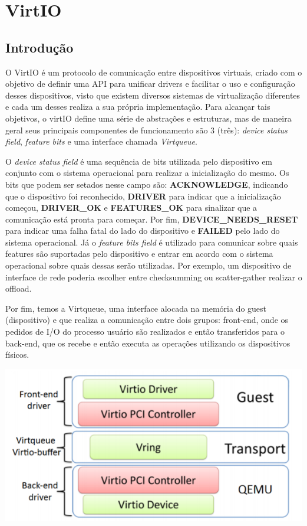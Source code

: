 \graphicspath{ {./assets/} }

\section*{VirtIO}

\subsection{Introdução}

O VirtIO é um protocolo de comunicação entre dispositivos virtuais, criado com o objetivo de definir uma API para unificar drivers e facilitar o uso e configuração desses dispositivos, 
visto que existem diversos sistemas de virtualização diferentes e cada um desses realiza a sua própria implementação.
Para alcançar tais objetivos, o virtIO define uma série de abstrações e estruturas, mas de maneira geral seus principais componentes de funcionamento são 3 (três): 
\emph{device status field}, \emph{feature bits} e uma interface chamada \emph{Virtqueue}.


O \emph{device status field} é uma sequência de bits utilizada pelo dispositivo em conjunto com o sistema operacional para realizar a inicialização do mesmo.
Os bits que podem ser setados nesse campo são: \textbf{ACKNOWLEDGE}, indicando que o dispositivo foi reconhecido, \textbf{DRIVER} para indicar que a inicialização começou, \textbf{DRIVER{\_}OK} e \textbf{FEATURES{\_}OK} para sinalizar que a comunicação está pronta para começar.
Por fim, \textbf{DEVICE{\_}NEEDS{\_}RESET} para indicar uma falha fatal do lado do dispositivo e \textbf{FAILED} pelo lado do sistema operacional.
Já o \emph{feature bits field} é utilizado para comunicar sobre quais features são suportadas pelo dispositivo e entrar em acordo com o sistema operacional sobre quais dessas serão utilizadas. Por exemplo, um dispositivo de interface de rede poderia escolher entre checksumming ou scatter-gather realizar o offload.

Por fim, temos a Virtqueue, uma interface alocada na memória do guest (dispositivo) e que realiza a comunicação entre dois grupos: front-end, onde os pedidos de I/O do processo usuário são realizados e então transferidos para o back-end, que os recebe e então executa as operações utilizando os dispositivos físicos. 

\includegraphics{virtio-arch.png}

